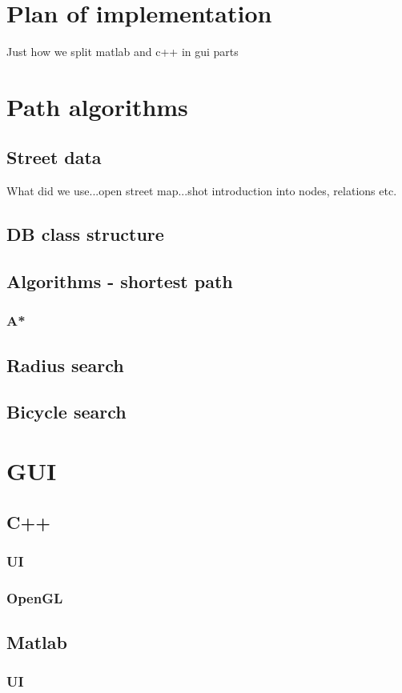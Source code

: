 \documentclass[reqno,openany,12pt]{amsbook}
\theoremstyle{definition}
\theoremstyle{remark}
\begin{document}
\chapter{Plan of implementation}
Just how we split matlab and c++ in gui parts

\chapter{Path algorithms}
\section{Street data}
What did we use...open street map...shot introduction into nodes, relations etc.
\section{DB class structure}
\section{Algorithms - shortest path}
\subsection{A*}
\section{Radius search}
\section{Bicycle search}
\chapter{GUI}
\section{C++}
\subsection{UI}
\subsection{OpenGL}
\section{Matlab}
\subsection{UI}
\end{document}
